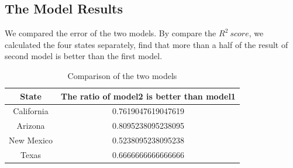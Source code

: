 \documentclass{mcmthesis}
\begin{document}
\subsection{The Model Results}
We compared the error of the two models. By compare the $R^2\ score$, we calculated the four states separately,
find that more than a half of the result of second model is better than the first model. %

\begin{table}[!htbp]
\centering
\caption{Comparison of the two models}\label{tab:aStrangeTable}
\begin{tabular}{cc}
\toprule
State& The ratio of model2 is better than model1\\
\midrule
California& 0.7619047619047619　\\
Arizona& 0.8095238095238095　\\
New Mexico& 0.5238095238095238 \\
Texas& 0.6666666666666666 \\
\bottomrule
\end{tabular}
\end{table}
\end{document}
